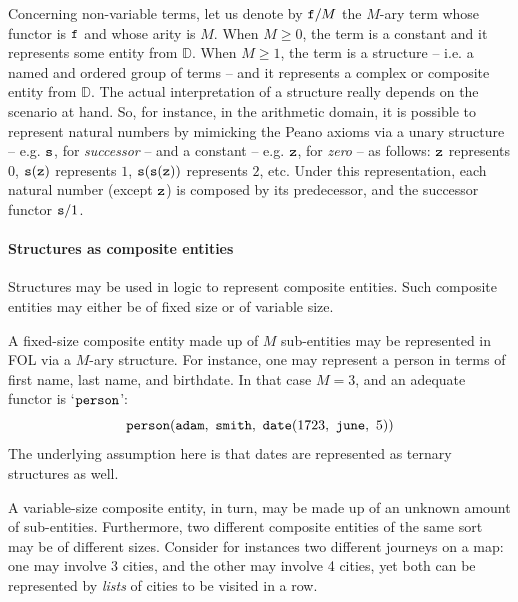 \documentclass[12pt,a4paper,openright,twoside]{book}
\begin{document}
Concerning non-variable terms, let us denote by $\mathtt{f}/M$ the $M$-ary term whose functor is $\mathtt{f}$ and whose arity is $M$.
%
When $M \geq 0$, the term is a constant and it represents some entity from $\mathbb{D}$.
%
When $M \geq 1$, the term is a structure -- i.e. a named and ordered group of terms -- and it represents a complex or composite entity from $\mathbb{D}$.
%
The actual interpretation of a structure really depends on the scenario at hand.
%
So, for instance, in the arithmetic domain, it is possible to represent natural numbers by mimicking the Peano axioms\footnotemark{} via a unary structure -- e.g. $\mathtt{s}$, for \emph{successor} -- and a constant -- e.g. $\mathtt{z}$, for \emph{zero} -- as follows:
$\mathtt{z}$ represents $0$,
$\mathtt{s}(\mathtt{z})$ represents $1$,
$\mathtt{s}(\mathtt{s}(\mathtt{z}))$ represents $2$, etc.
%
Under this representation, each natural number (except $\mathtt{z}$) is composed by its predecessor, and the successor functor $\mathtt{s}/1$.


\paragraph{Structures as composite entities}

Structures may be used in logic to represent composite entities.
%
Such composite entities may either be of fixed size or of variable size.

A fixed-size composite entity made up of $M$ sub-entities may be represented in FOL via a $M$-ary structure.
%
For instance, one may represent a person in terms of first name, last name, and birthdate.
%
In that case $M = 3$, and an adequate functor is `$\mathtt{person}$':
%
$$
\functor{person}(\functor{adam},\ \functor{smith},\ \functor{date}(1723,\ \functor{june},\ 5))
$$
%
The underlying assumption here is that dates are represented as ternary structures as well.

A variable-size composite entity, in turn, may be made up of an unknown amount of sub-entities.
%
Furthermore, two different composite entities of the same sort may be of different sizes.
%
Consider for instances two different journeys on a map: one may involve 3 cities, and the other may involve 4 cities, yet both can be represented by \emph{lists} of cities to be visited in a row.
\end{document}

